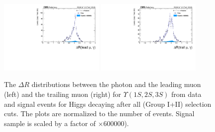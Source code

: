 \begin{figure}[!htbp]
\begin{center}
\includegraphics[width=0.45\textwidth]{figures/outputPlots/HtoUpsilon_Cat0_ZZZZZ/nEvts/data_x_mc/withKinCuts/h_withKin_deltaR_Leading_Photon}\hspace*{1.cm}
\includegraphics[width=0.45\textwidth]{figures/outputPlots/HtoUpsilon_Cat0_ZZZZZ/nEvts/data_x_mc/withKinCuts/h_withKin_deltaR_Trailing_Photon}\end{center}\vspace*{-.5cm}
\caption{The $\Delta R$ distributions between the photon and the leading muon (left) and the trailing muon (right) for $\Upsilon(1S,2S,3S)$ from data and signal events for Higgs decaying after all (Group I+II) selection cuts. The plots are normalized to the number of events. Signal sample is scaled by a factor of $\times 600000$).}
\label{fig:deltaR_HtoUpsilon_Cat0_groupI_plus_II}
\end{figure}


